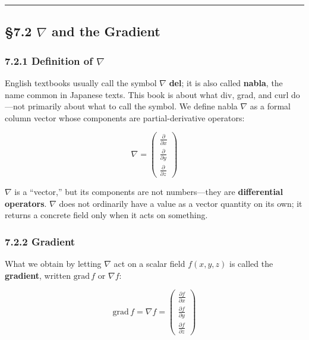 \begin{center}\rule{0.5\linewidth}{0.5pt}\end{center}

\hypertarget{nabla-and-the-gradient}{%
\subsection{\texorpdfstring{§7.2 \(\nabla\) and the
Gradient}{§7.2 \textbackslash nabla and the Gradient}}\label{nabla-and-the-gradient}}

\hypertarget{definition-of-nabla}{%
\subsubsection{\texorpdfstring{7.2.1 Definition of
\(\nabla\)}{7.2.1 Definition of \textbackslash nabla}}\label{definition-of-nabla}}

English textbooks usually call the symbol \(\nabla\) \textbf{del}; it is
also called \textbf{nabla}, the name common in Japanese texts. This book
is about what div, grad, and curl do---not primarily about what to call
the symbol. We define nabla \(\nabla\) as a formal column vector whose
components are partial-derivative operators:

\[\nabla = \begin{pmatrix}
\frac{\partial}{\partial x} \\[0.5em]
\frac{\partial}{\partial y} \\[0.5em]
\frac{\partial}{\partial z}
\end{pmatrix}\]

\(\nabla\) is a ``vector,'' but its components are not numbers---they
are \textbf{differential operators}. \(\nabla\) does not ordinarily have
a value as a vector quantity on its own; it returns a concrete field
only when it acts on something.

\hypertarget{gradient}{%
\subsubsection{7.2.2 Gradient}\label{gradient}}

What we obtain by letting \(\nabla\) act on a scalar field \(f(x,y,z)\)
is called the \textbf{gradient}, written \(\mathrm{grad}\,f\) or
\(\nabla f\):

\[\mathrm{grad}\,f = \nabla f = \begin{pmatrix}
\frac{\partial f}{\partial x} \\[0.5em]
\frac{\partial f}{\partial y} \\[0.5em]
\frac{\partial f}{\partial z}
\end{pmatrix}\]

